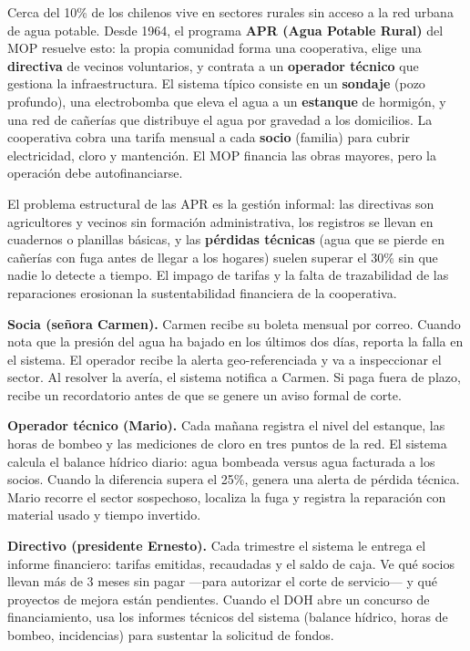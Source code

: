 \documentclass[12pt]{article}
\begin{document}
Cerca del 10\% de los chilenos vive en sectores rurales sin acceso a la red
urbana de agua potable. Desde 1964, el programa \textbf{APR (Agua Potable
Rural)} del MOP resuelve esto: la propia comunidad forma una cooperativa,
elige una \textbf{directiva} de vecinos voluntarios, y contrata a un
\textbf{operador técnico} que gestiona la infraestructura. El sistema típico
consiste en un \textbf{sondaje} (pozo profundo), una electrobomba que eleva
el agua a un \textbf{estanque} de hormigón, y una red de cañerías que
distribuye el agua por gravedad a los domicilios. La cooperativa cobra una
tarifa mensual a cada \textbf{socio} (familia) para cubrir electricidad,
cloro y mantención. El MOP financia las obras mayores, pero la operación
debe autofinanciarse.

El problema estructural de las APR es la gestión informal: las directivas
son agricultores y vecinos sin formación administrativa, los registros se
llevan en cuadernos o planillas básicas, y las \textbf{pérdidas técnicas}
(agua que se pierde en cañerías con fuga antes de llegar a los hogares)
suelen superar el 30\% sin que nadie lo detecte a tiempo. El impago de
tarifas y la falta de trazabilidad de las reparaciones erosionan la
sustentabilidad financiera de la cooperativa.

\noindent\textbf{Socia (señora Carmen).}
Carmen recibe su boleta mensual por correo. Cuando nota que la presión del
agua ha bajado en los últimos dos días, reporta la falla en el sistema.
El operador recibe la alerta geo-referenciada y va a inspeccionar el sector.
Al resolver la avería, el sistema notifica a Carmen. Si paga fuera de plazo,
recibe un recordatorio antes de que se genere un aviso formal de corte.

\noindent\textbf{Operador técnico (Mario).}
Cada mañana registra el nivel del estanque, las horas de bombeo y las
mediciones de cloro en tres puntos de la red. El sistema calcula el balance
hídrico diario: agua bombeada versus agua facturada a los socios. Cuando
la diferencia supera el 25\%, genera una alerta de pérdida técnica. Mario
recorre el sector sospechoso, localiza la fuga y registra la reparación con
material usado y tiempo invertido.

\noindent\textbf{Directivo (presidente Ernesto).}
Cada trimestre el sistema le entrega el informe financiero: tarifas emitidas,
recaudadas y el saldo de caja. Ve qué socios llevan más de 3 meses sin pagar
---para autorizar el corte de servicio--- y qué proyectos de mejora están
pendientes. Cuando el DOH abre un concurso de financiamiento, usa los
informes técnicos del sistema (balance hídrico, horas de bombeo, incidencias)
para sustentar la solicitud de fondos.
\end{document}
